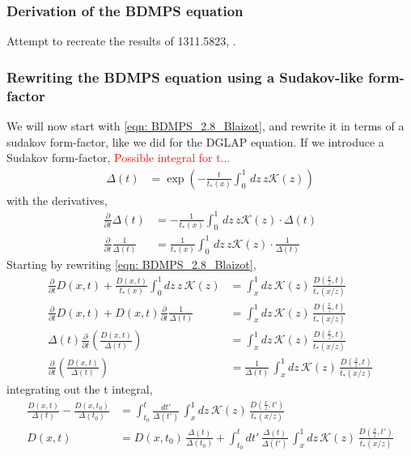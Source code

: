 \documentclass[main.tex]{subfiles}
\begin{document}
\subsubsection{Derivation of the BDMPS equation}
Attempt to recreate the results of 1311.5823, \cite{Probabilistic_picture_for_medium-induced_jet_evolution}.
\subsubsection{Rewriting the BDMPS equation using a Sudakov-like form-factor}\label{sec: medium_sudakov}
We will now start with \autoref{eqn: BDMPS_2.8_Blaizot}, and rewrite it in terms of a sudakov form-factor, like we did for the DGLAP equation. 
If we introduce a Sudakov form-factor, \textcolor{red}{Possible integral for t...}
\begin{align}\label{eqn: BDMPS_sudakov}
    \Delta (t) &= \exp \left( -\frac{t}{t_*(x)} \int_0^1 \, dz\, z \mathcal{K}(z) \right)
\end{align}
with the derivatives, 
\begin{align}
    \frac{\partial}{\partial t} \Delta (t) &= - \frac{1}{t_*(x)} \int_0^1 \, dz\, z \mathcal{K}(z) \cdot \Delta(t) \nonumber\\
    \frac{\partial}{\partial t} \frac{1}{\Delta (t)} &= \frac{1}{t_*(x)} \int_0^1 \, dz\, z \mathcal{K}(z) \cdot \frac{1}{\Delta(t) }
\end{align}
Starting by rewriting \autoref{eqn: BDMPS_2.8_Blaizot},
\begin{align}
    \frac{\partial}{\partial t} D(x,t) + \frac{D\left(x,t\right)}{t_*(x)} \int_0^1 dz\, z\, \mathcal{K}(z) &= \int_x^1 dz\, \mathcal{K}(z)\, \frac{D\left(\frac{x}{z}, t\right)}{t_*(x/z)} \nonumber\\
    \frac{\partial}{\partial t} D(x,t) + D(x,t) \frac{\partial}{\partial t} \frac{1}{\Delta(t)} &= \int_x^1 dz\, \mathcal{K}(z)\, \frac{D\left(\frac{x}{z}, t\right)}{t_*(x/z)} \nonumber\\
    \Delta(t) \frac{\partial}{\partial t} \left( \frac{D(x,t)}{\Delta(t)} \right) &= \int_x^1 dz\, \mathcal{K}(z)\, \frac{D\left(\frac{x}{z}, t\right)}{t_*(x/z)} \nonumber\\
    \frac{\partial}{\partial t} \left( \frac{D(x,t)}{\Delta(t)} \right) &= \frac{1}{\Delta(t)} \, \int_x^1 dz\, \mathcal{K}(z)\, \frac{D\left(\frac{x}{z}, t\right)}{t_*(x/z)} 
\end{align}
integrating out the t integral, 
\begin{align}
    \frac{D(x,t)}{\Delta(t)} - \frac{D(x,t_0)}{\Delta(t_0)} &= \int_{t_0}^t \frac{dt'}{\Delta(t')} \, \int_x^1 dz\, \mathcal{K}(z)\, \frac{D\left(\frac{x}{z}, t'\right)}{t_*(x/z)} \nonumber\\
    D(x,t) &= D(x,t_0)\, \frac{\Delta(t)}{\Delta(t_0)} + \int_{t_0}^t dt' \, \frac{\Delta(t)}{\Delta(t')} \, \int_x^1 dz\, \mathcal{K}(z)\, \frac{D\left(\frac{x}{z}, t'\right)}{t_*(x/z)} 
\end{align}
\end{document}
